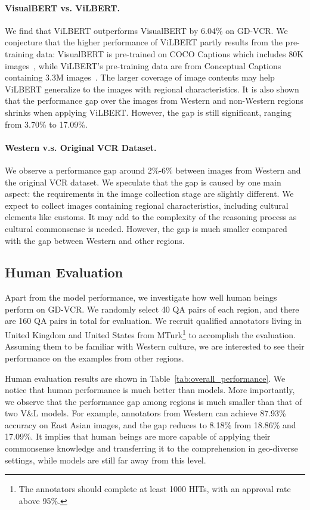\documentclass[11pt]{article}
\begin{document}
\paragraph{VisualBERT vs. ViLBERT.} We find that ViLBERT outperforms VisualBERT by 6.04\% on GD-VCR. We conjecture that the higher performance of ViLBERT partly results from the pre-training data: VisualBERT is pre-trained on COCO Captions which includes 80K images~\cite{Chen2015MicrosoftCC}, while ViLBERT's pre-training data are from Conceptual Captions containing 3.3M images~\cite{sharma-etal-2018-conceptual}. The larger coverage of image contents may help ViLBERT generalize to the images with regional characteristics. It is also shown that the performance gap over the images from Western and non-Western regions shrinks when applying ViLBERT. However, the gap is still significant, ranging from 3.70\% to 17.09\%.  

\paragraph{Western v.s. Original VCR Dataset.} We observe a performance gap around 2\%-6\% between images from Western and the original VCR dataset. We speculate that the gap is caused by one main aspect: the requirements in the image collection stage are slightly different. We expect to collect images containing regional characteristics, including cultural elements like customs. It may add to the complexity of the reasoning process as cultural commonsense is needed. However, the gap is much smaller compared with the gap between Western and other regions.

\subsection{Human Evaluation}
Apart from the model performance, we investigate how well human beings perform on GD-VCR. We randomly select 40 QA pairs of each region, and there are 160 QA pairs in total for evaluation. We recruit qualified annotators living in United Kingdom and United States from MTurk\footnote{The annotators should complete at least 1000 HITs, with an approval rate above 95\%.} to accomplish the evaluation. Assuming them to be familiar with Western culture, we are interested to see their performance on the examples from other regions.

Human evaluation results are shown in Table~\ref{tab:overall_performance}. We notice that human performance is much better than models. More importantly, we observe that the performance gap among regions is much smaller than that of two V\&L models. For example, annotators from Western can achieve 87.93\% accuracy on East Asian images, and the gap reduces to 8.18\% from 18.86\% and 17.09\%. It implies that human beings are more capable of applying their commonsense knowledge and transferring it to the comprehension in geo-diverse settings, while models are still far away from this level.
\end{document}
